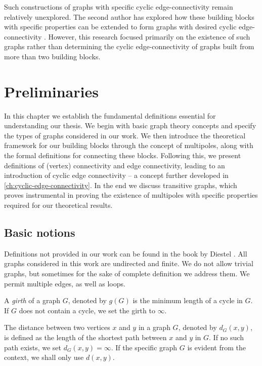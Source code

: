 \documentclass[12pt, twoside]{book}
\begin{document}
Such constructions of graphs with specific cyclic edge-connectivity remain relatively unexplored. The second author has explored how these building blocks with specific properties can be extended to form graphs with desired cyclic edge-connectivity \cite{Rajnik_phd}. However, this research focused primarily on the existence of such graphs rather than determining the cyclic edge-connectivity of graphs built from more than two building blocks.

\todo{}

\chapter{Preliminaries}\label{ch:preliminaries}

In this chapter we establish the fundamental definitions essential for understanding our thesis. We begin with basic graph theory concepts and specify the types of graphs considered in our work. We then introduce the theoretical framework for our building blocks through the concept of multipoles, along with the formal definitions for connecting these blocks. Following this, we present definitions of (vertex) connectivity and edge connectivity, leading to an introduction of cyclic edge connectivity -- a concept further developed in \cref{ch:cyclic-edge-connectivity}. In the end we discuss transitive graphs, which proves instrumental in proving the existence of multipoles with specific properties required for our theoretical results.

\section{Basic notions}

Definitions not provided in our work can be found in the book  by Diestel \cite{Diestel}. All graphs considered in this work are undirected and finite. We do not allow trivial graphs, but sometimes for the sake of complete definition we address them. We permit multiple edges, as well as loops.

A \textit{girth} of a graph $G$, denoted by $g(G)$ is the minimum length of a cycle in $G$. If $G$ does not contain a cycle, we set the girth to $\infty$.

The distance between two vertices $x$ and $y$ in a graph $G$, denoted by $d_G(x,y)$, is defined as the length of the shortest path between $x$ and $y$ in $G$. If no such path exists, we set $d_G(x,y)=\infty$. If the specific graph $G$ is evident from the context, we shall only use $d(x,y)$.
\end{document}
